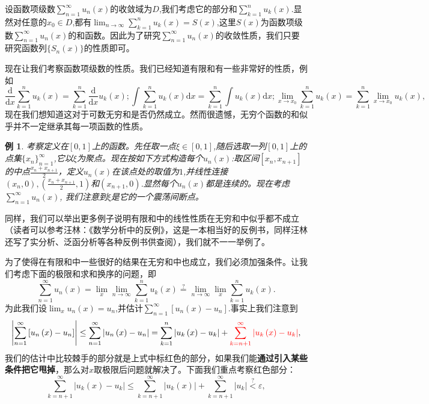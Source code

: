 \documentclass{article}
\newtheorem{example}{例}[subsection]
\begin{document}
设函数项级数$\sum_{n=1}^\infty u_n(x)$的收敛域为$D$,我们考虑它的部分和$\sum_{k=1}^nu_k(x)$.显然对任意的$x_0\in D$,都有$\lim_{n\to\infty}\sum_{k=1}^nu_k(x)=S(x)$,这里$S(x)$为函数项级数$\sum_{n=1}^\infty u_n(x)$的和函数。因此为了研究$\sum_{n=1}^\infty u_n(x)$的收敛性质，我们只要研究函数列$\{S_n(x)\}$的性质即可。\par
现在让我们考察函数项级数的性质。我们已经知道有限和有一些非常好的性质，例如
$$
\frac{\mathrm{d}}{\mathrm{d}x}\sum_{k=1}^n{u_k\left( x \right)}=\sum_{k=1}^n{\frac{\mathrm{d}}{\mathrm{d}x}u_k\left( x \right)};\int{\sum_{k=1}^n{u_k\left( x \right)}\mathrm{d}x}=\sum_{k=1}^n{\int{u_k\left( x \right) \mathrm{d}x}};\lim_{x\rightarrow x_0} \sum_{k=1}^n{u_k\left( x \right)}=\sum_{k=1}^n{\lim_{x\rightarrow x_0} u_k\left( x \right)},
$$
现在我们想知道这对于可数无穷和是否仍然成立。然而很遗憾，无穷个函数的和似乎并不一定继承其每一项函数的性质。
\begin{example}
考察定义在$[0,1]$上的函数。先任取一点$\xi\in[0,1]$,随后选取一列$[0,1]$上的点集$\{x_n\}_{n=1}^\infty$,它以$\xi$为聚点。现在按如下方式构造每个$u_n(x)$:取区间$[x_n,x_{n+1}]$的中点$\frac{x_n+x_{n+1}}{2}$，定义$u_n(x)$在该点处的取值为$1$,并线性连接$(x_n,0),\left(\frac{x_n+x_{n+1}}{2},1\right)$和$(x_{n+1},0)$.显然每个$u_n(x)$都是连续的。现在考虑$\sum_{n=1}^\infty u_n(x)$, 我们注意到$\xi$是它的一个震荡间断点。
\end{example}
同样，我们可以举出更多例子说明有限和中的线性性质在无穷和中似乎都不成立（读者可以参考汪林：《数学分析中的反例》，这是一本相当好的反例书，同样汪林还写了实分析、泛函分析等各种反例书供查阅），我们就不一一举例了。\par
为了使得在有限和中一些很好的结果在无穷和中也成立，我们必须加强条件。让我们考虑下面的极限和求和换序的问题，即
$$
\sum_{n=1}^{\infty}{u_n\left( x \right)}=\lim_x \lim_{n\rightarrow \infty} \sum_{k=1}^n{u_k\left( x \right)}\overset{?}{=}\lim_{n\rightarrow \infty} \lim_x \sum_{k=1}^n{u_k\left( x \right)}.
$$
为此我们设$\lim_{x}u_n(x)=u_n$,并估计$\sum_{n=1}^{\infty}{\left[ u_n\left( x \right) -u_n \right]}$.事实上我们注意到
$$
\left| \sum_{n=1}^{\infty}{\left[ u_n\left( x \right) -u_n \right]} \right|\le \sum_{n=1}^{\infty}{\left| u_n\left( x \right) -u_n \right|}=\sum_{k=1}^n{\left| u_k\left( x \right) -u_k \right|}+{\color{red} \sum_{k=n+1}^{\infty}{\left| u_k\left( x \right) -u_k \right|}},
$$
我们的估计中比较棘手的部分就是上式中标红色的部分，如果我们能\textbf{通过引入某些条件把它甩掉}，那么对$x$取极限后问题就解决了。下面我们重点考察红色部分：
$$
\sum_{k=n+1}^{\infty}{\left| u_k\left( x \right) -u_k \right|}\le \sum_{k=n+1}^{\infty}{\left| u_k\left( x \right) \right|}+\sum_{k=n+1}^{\infty}{\left| u_k \right|}\overset{?}{<}\varepsilon ,
$$
\end{document}
